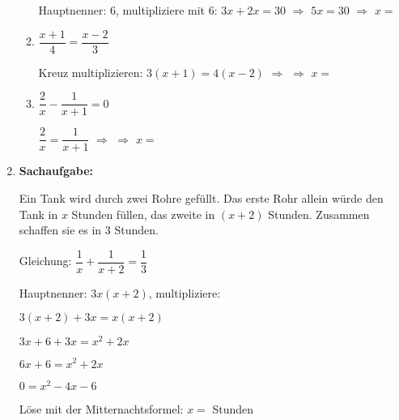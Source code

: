 \begin{enumerate}[label=\arabic*., resume]
\begin{enumerate}[label=\alph*)]
        Hauptnenner: 6, multipliziere mit 6: $3x + 2x = 30$ $\Rightarrow$ $5x = 30$ $\Rightarrow$ $x =$ \underline{\hspace{2cm}}

        \vspace{0.5cm}
        \item $\dfrac{x+1}{4} = \dfrac{x-2}{3}$
        \vspace{0.3cm}

        Kreuz multiplizieren: $3(x+1) = 4(x-2)$ $\Rightarrow$ \underline{\hspace{6cm}} $\Rightarrow$ $x =$ \underline{\hspace{2cm}}

        \vspace{0.5cm}
        \item $\dfrac{2}{x} - \dfrac{1}{x+1} = 0$
        \vspace{0.3cm}

        $\dfrac{2}{x} = \dfrac{1}{x+1}$ $\Rightarrow$ \underline{\hspace{6cm}} $\Rightarrow$ $x =$ \underline{\hspace{2cm}}
    \end{enumerate}

    \vspace{1cm}

    \item \textbf{Sachaufgabe:}
    \vspace{0.5cm}

    Ein Tank wird durch zwei Rohre gefüllt. Das erste Rohr allein würde den Tank in $x$ Stunden füllen, das zweite in $(x+2)$ Stunden. Zusammen schaffen sie es in 3 Stunden.

    Gleichung: $\dfrac{1}{x} + \dfrac{1}{x+2} = \dfrac{1}{3}$

    Hauptnenner: $3x(x+2)$, multipliziere:

    $3(x+2) + 3x = x(x+2)$

    $3x + 6 + 3x = x^2 + 2x$

    $6x + 6 = x^2 + 2x$

    $0 = x^2 - 4x - 6$

    Löse mit der Mitternachtsformel: $x =$ \underline{\hspace{3cm}} Stunden

\end{enumerate}